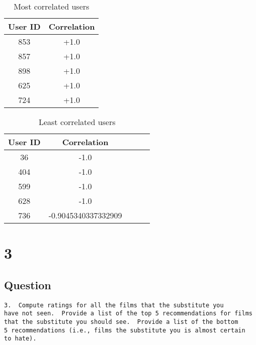 \documentclass[letterpaper,11pt]{article}
\begin{document}
\begin{table}[htb]
\centering
\begin{tabular}{ | c | c |}
\hline
\textbf{User ID} & \textbf{Correlation} \\
\hline
853 & +1.0 \\
\hline
857 & +1.0 \\
\hline
898 & +1.0 \\ 
\hline
625 & +1.0 \\
\hline
724 & +1.0 \\
\hline
\end{tabular}
\caption{Most correlated users}
\label{table:q2most}
\end{table}

\begin{table}[htb]
\centering
\begin{tabular}{ | c | c | c | | c | c |}
\hline
\textbf{User ID} & \textbf{Correlation} \\
\hline
36 & -1.0 \\
\hline
404 & -1.0 \\
\hline
599 & -1.0 \\ 
\hline
628 & -1.0 \\
\hline
736 & -0.9045340337332909 \\
\hline
\end{tabular}
\caption{Least correlated users}
\label{table:q2least}
\end{table}

\clearpage

 

\clearpage


\section*{3}

\subsection*{Question}

\begin{verbatim}
3.  Compute ratings for all the films that the substitute you
have not seen.  Provide a list of the top 5 recommendations for films
that the substitute you should see.  Provide a list of the bottom
5 recommendations (i.e., films the substitute you is almost certain
to hate).
\end{verbatim}
\end{document}
